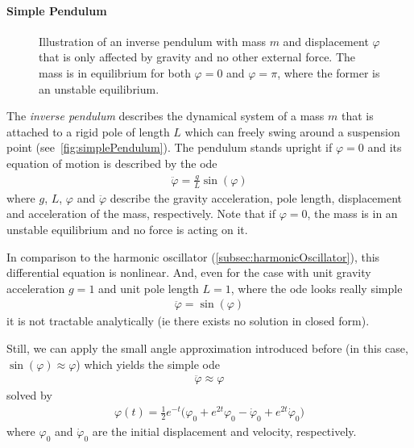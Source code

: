 	\paragraph{Simple Pendulum}
		\label{subsec:simplePendulum}

		\begin{figure}
			\centering
			\tikzSimplePendulum
			\caption{Illustration of an inverse pendulum with mass \(m\) and displacement \(\varphi\) that is only affected by gravity and no other external force. The mass is in equilibrium for both \( \varphi = 0 \) and \( \varphi = \pi \), where the former is an unstable equilibrium.}
			\label{fig:simplePendulum}
		\end{figure}

		The \emph{inverse pendulum} describes the dynamical system of a mass \(m\) that is attached to a rigid pole of length \(L\) which can freely swing around a suspension point (see~\autoref{fig:simplePendulum}). The pendulum stands upright if \( \varphi = 0 \) and its equation of motion is described by the \ac{ode}
		\begin{align*}
			\ddot{\varphi} = \frac{g}{L} \sin(\varphi)
		\end{align*}
		where \(g\), \(L\), \(\varphi\) and \(\ddot{\varphi}\) describe the gravity acceleration, pole length, displacement and acceleration of the mass, respectively. Note that if \( \varphi = 0 \), the mass is in an unstable equilibrium and no force is acting on it.

		In comparison to the harmonic oscillator (\autoref{subsec:harmonicOscillator}), this differential equation is nonlinear. And, even for the case with unit gravity acceleration \( g = 1 \) and unit pole length \( L = 1\), where the \ac{ode} looks really simple
		\begin{align}
			\ddot{\varphi} = \sin(\varphi)  \label{eq:inversePendulum}
		\end{align}
		it is not tractable analytically (\ac{ie} there exists no solution in closed form).

		Still, we can apply the small angle approximation introduced before (in this case, \( \sin(\varphi) \approx \varphi \)) which yields the simple \ac{ode}
		\begin{align}
			\ddot{\varphi} \approx \varphi  \label{eq:linearizedInversePendulum}
		\end{align}
		solved by
		\begin{align*}
			\varphi(t) = \frac{1}{2} e^{-t} \big(\varphi_0 + e^{2t} \varphi_0 - \dot{\varphi}_0 + e^{2t} \dot{\varphi}_0\big)
		\end{align*}
		where \(\varphi_0\) and \(\dot{\varphi}_0\) are the initial displacement and velocity, respectively.

